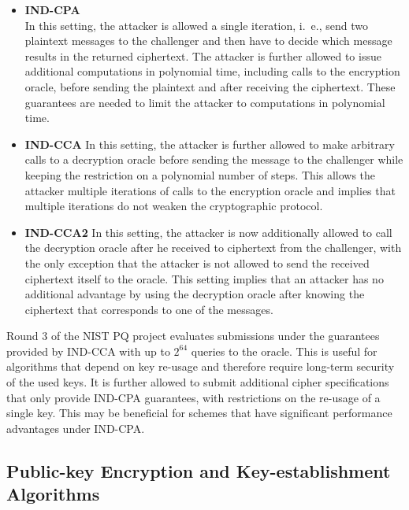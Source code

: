 \begin{itemize}
    \item \textbf{\ac{IND-CPA}} \\
    In this setting, the attacker is allowed a single iteration, i.~e., send two plaintext messages to the challenger and then have to decide which message results in the returned ciphertext. The attacker is further allowed to issue additional computations in polynomial time, including calls to the encryption oracle, before sending the plaintext and after receiving the ciphertext. These guarantees are needed to limit the attacker to computations in polynomial time.
    \item \textbf{\ac{IND-CCA}}
    In this setting, the attacker is further allowed to make arbitrary calls to a decryption oracle before sending the message to the challenger while keeping the restriction on a polynomial number of steps. This allows the attacker multiple iterations of calls to the encryption oracle and implies that multiple iterations do not weaken the cryptographic protocol.
    \item \textbf{\ac{IND-CCA2}}
    In this setting, the attacker is now additionally allowed to call the decryption oracle after he received to ciphertext from the challenger, with the only exception that the attacker is not allowed to send the received ciphertext itself to the oracle. This setting implies that an attacker has no additional advantage by using the decryption oracle after knowing the ciphertext that corresponds to one of the messages.  
\end{itemize}

Round 3 of the \ac{NIST} PQ project evaluates submissions under the guarantees provided by \ac{IND-CCA} with up to \(2^{64}\) queries to the oracle. This is useful for algorithms that depend on key re-usage and therefore require long-term security of the used keys. It is further allowed to submit additional cipher specifications that only provide \ac{IND-CPA} guarantees, with restrictions on the re-usage of a single key. This may be beneficial for schemes that have significant performance advantages under \ac{IND-CPA}.



\subsection{Public-key Encryption and Key-establishment Algorithms}


